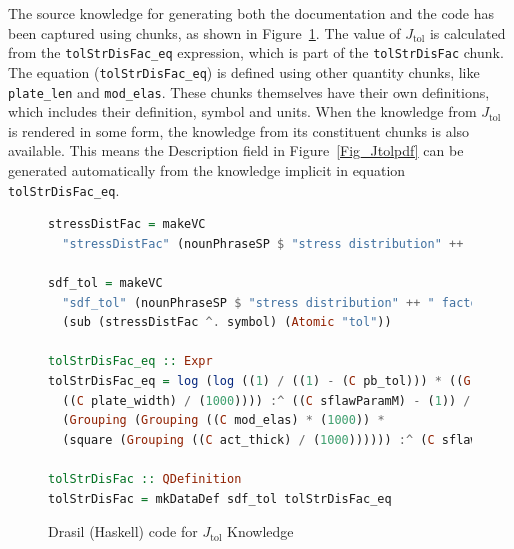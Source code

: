 \documentclass[sigconf]{acmart}
\newcommand{\jtol}{$J_{\mbox{tol}}$}
\newcommand{\inlHask}[1]{\lstinline[language=Haskell, columns=fullflexible,
  basicstyle=\ttfamily, showstringspaces=false, breaklines=true]{#1}}
\begin{document}
The source knowledge for generating both the documentation and the code has been
captured using chunks, as shown in Figure~\ref{Fig_JtolDrasil}. The value of
\jtol{} is calculated from the {\inlHask{tolStrDisFac_eq}} expression, which is
part of the {\inlHask{tolStrDisFac}} chunk.  The equation ({\inlHask{tolStrDisFac_eq}}) is
defined using other quantity chunks, like {\inlHask{plate_len}} and
{\inlHask{mod_elas}}.  These chunks themselves have their own definitions, which
includes their definition, symbol and units.  When the knowledge from \jtol{} is
rendered in some form, the knowledge from its constituent chunks is also
available.  This means the Description field in Figure~\ref{Fig_Jtolpdf} can be
generated automatically from the knowledge implicit in equation
{\inlHask{tolStrDisFac_eq}}.  

\begin{figure}
\begin{lstlisting}[language=Haskell, frame=single, showstringspaces=false] 
stressDistFac = makeVC 
  "stressDistFac" (nounPhraseSP $ "stress distribution" ++ " factor (Function)") cJ

sdf_tol = makeVC 
  "sdf_tol" (nounPhraseSP $ "stress distribution" ++ " factor (Function) based on Pbtol") 
  (sub (stressDistFac ^. symbol) (Atomic "tol"))

tolStrDisFac_eq :: Expr
tolStrDisFac_eq = log (log ((1) / ((1) - (C pb_tol))) * ((Grouping (((C plate_len) / (1000)) * 
  ((C plate_width) / (1000)))) :^ ((C sflawParamM) - (1)) / ((C sflawParamK) * 
  (Grouping (Grouping ((C mod_elas) * (1000)) * 
  (square (Grouping ((C act_thick) / (1000)))))) :^ (C sflawParamM) * (C loadDF))))

tolStrDisFac :: QDefinition
tolStrDisFac = mkDataDef sdf_tol tolStrDisFac_eq
\end{lstlisting}
\caption{Drasil (Haskell) code for \jtol{} Knowledge}
\label{Fig_JtolDrasil}
\end{figure}
\end{document}
